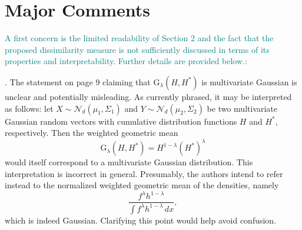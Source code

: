 \documentclass[a4paper,12pt]{article}
\begin{document}
\section*{{Major Comments}}

% 

\noindent \textcolor{teal}{A first concern is the limited readability of Section 2 and the fact that the proposed dissimilarity
measure is not sufficiently discussed in terms of its properties and interpretability. 
Further details are provided below.:}


{\color{teal}
. The statement on page 9 claiming that $\mathrm{G}_{\lambda}(H, H^*)$ is multivariate Gaussian is unclear and potentially misleading. 
As currently phrased, it may be interpreted as follows: let $X \sim \mathcal{N}_d(\mu_1, \Sigma_1)$ and $Y \sim \mathcal{N}_d(\mu_2, \Sigma_2)$ be two multivariate Gaussian random vectors with cumulative distribution functions $H$ and $H^*$, respectively. 
Then the weighted geometric mean
\[
  \mathrm{G}_{\lambda}(H, H^*) = H^{1-\lambda}(H^*)^{\lambda}
\]
would itself correspond to a multivariate Gaussian distribution. 
This interpretation is incorrect in general. 
Presumably, the authors intend to refer instead to the normalized weighted geometric mean of the densities, namely
\[
  \frac{f^{\lambda}h^{1-\lambda}}{\int f^{\lambda}h^{1-\lambda}\,dx},
\]
which is indeed Gaussian. 
Clarifying this point would help avoid confusion.
}
\end{document}
